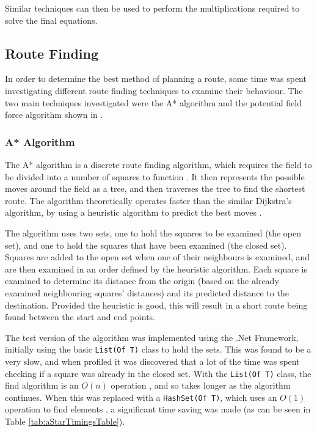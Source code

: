 \documentclass[10pt]{article}
\begin{document}
Similar techniques can then be used to perform the multiplications required to
solve the final equations.

\subsection{Route Finding}
In order to determine the best method of planning a route, some time was spent
investigating different route finding techniques to examine their behaviour. 
The two main techniques investigated were the A* algorithm and the potential
field force algorithm shown in \cite{intelligentAlgorithmPathPlanning}.

\subsubsection{A* Algorithm}

The A* algorithm is a discrete route finding algorithm, which requires the field
to be divided into a number of squares to function \cite{aiModernApproach}.  It
then represents the possible moves around the field as a tree, and then
traverses the tree to find the shortest route.  The algorithm theoretically
operates faster than the similar Dijkstra's algorithm, by using a heuristic
algorithm to predict the best moves \cite{wikipediaAStar}.

The algorithm uses two sets, one to hold the squares to be examined (the open
set), and one to hold the squares that have been examined (the closed set).
Squares are added to the open set when one of their neighbours is examined, and
are then examined in an order defined by the heuristic algorithm.  Each square
is examined to determine its distance from the origin (based on the already
examined neighbouring squares' distances) and its predicted distance to the
destination. Provided the heuristic is good, this will result in a short route
being found between the start and end points.

The test version of the algorithm was implemented using the .Net Framework,
initially using the basic \texttt{List(Of T)} class to hold the sets.  This was
found to be a very slow, and when profiled it was discovered that a lot of the
time was spent checking if a square was already in the closed set.  With the
\texttt{List(Of T)} class, the find algorithm is an $O(n)$ operation
\cite{msdnListOfT}, and so takes longer as the algorithm continues.  When this
was replaced with a \texttt{HashSet(Of T)}, which uses an $O(1)$ operation to
find elements \cite{msdnHashSetOfT}, a significant time saving was made (as can
be seen in Table \ref{tab:aStarTimingsTable}).
\end{document}
